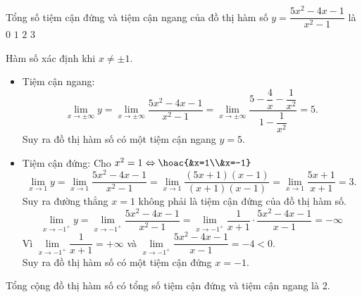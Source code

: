 \begin{ex}%
	Tổng số tiệm cận đứng và tiệm cận ngang của đồ thị hàm số $ y=\dfrac{5x^2-4x-1}{x^2-1} $ là 
	\choice
	{$ 0 $}
	{$ 1 $}
	{\True $ 2 $}
	{$ 3 $}
	\loigiai
	{
		Hàm số xác định khi $x \ne \pm 1$.
		\begin{itemize}
			\item Tiệm cận ngang:
			\[\lim \limits_{x \to \pm\infty} y = \lim \limits_{x \to \pm \infty} \dfrac{5x^2-4x-1}{x^2-1} = \lim \limits_{x \to \pm \infty} \dfrac{5-\dfrac{4}{x}-\dfrac{1}{x^2}}{1-\dfrac{1}{x^2}}=5.\]
			Suy ra đồ thị hàm số có một tiệm cận ngang $ y=5 $.
			\item Tiệm cận đứng:
			Cho $x^2=1 \Leftrightarrow \hoac{&x=1\\&x=-1}$
			\[\lim \limits_{x \to 1} y=\lim \limits_{x \to 1} \dfrac{5x^2-4x-1}{x^2-1} = \lim \limits_{x \to 1} \dfrac{(5x+1)(x-1)}{(x+1)(x-1)}=\lim \limits_{x \to 1} \dfrac{5x+1}{x+1}=3.\]
			Suy ra đường thẳng $ x=1 $ không phải là tiệm cận đứng của đồ thị hàm số.
			\[\lim \limits_{x \to -1^{+}} y=\lim \limits_{x \to -1^{+}} \dfrac{5x^2-4x-1}{x^2-1} = \lim \limits_{x \to -1^{+}} \dfrac{1}{x+1} \cdot \dfrac{5x^2-4x-1}{x-1}=-\infty \]
			Vì $\lim \limits_{x \to -1^{+}} \dfrac{1}{x+1} =+\infty$ và $\lim \limits_{x \to -1^{+}}\dfrac{5x^2-4x-1}{x-1} =-4<0$.\\
			Suy ra đồ thị hàm số có một tiệm cận đứng $ x=-1 $.
		\end{itemize}
		Tổng cộng đồ thị hàm số có tổng số tiệm cận đứng và tiệm cận ngang là 2.
	}
\end{ex}

\begin{ex}%
\end{ex}

